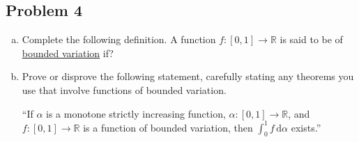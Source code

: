 \documentclass[12pt]{article}
\newcommand{\real}{\mathbb{R}}
\theoremstyle{definition}
\begin{document}
\subsection{Problem 4 \texorpdfstring{\cite{SS}}{}}
\begin{enumerate}[a.]
    \item Complete the following definition. A function $f : [0,1] \to \real$ is said to be of \underline{bounded variation} if?
    \item Prove or disprove the following statement, carefully stating any theorems you use that involve functions of bounded variation.
    
    ``If $\alpha$ is a monotone strictly increasing function, $\alpha : [0,1] \to \real$, and $f : [0,1] \to \real$ is a function of bounded variation, then $\displaystyle \int_0^1 f \, \mathrm{d}\alpha$ exists.''
\end{enumerate}
\end{document}
